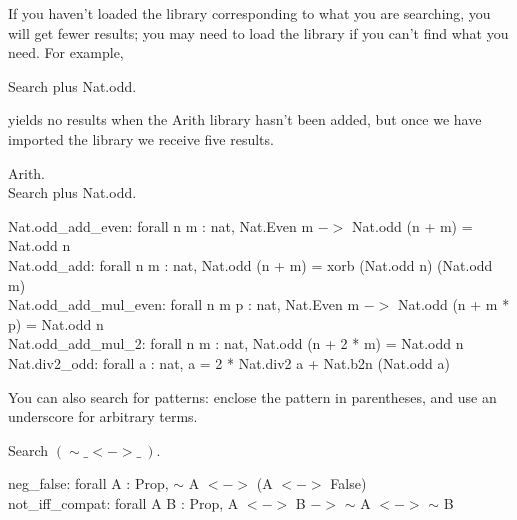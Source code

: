 \noindent 
If you haven't loaded the library corresponding to what you are searching, you will get fewer results; you may need to load the library if you can't find what you need. For example,
\begin{code}
	Search plus Nat.odd.
\end{code}
yields no results when the Arith library hasn't been added, but once we have imported the library we receive five results.
\begin{code}
	 Arith. 	\\
	Search plus Nat.odd.
\end{code}
\begin{msg}
	Nat.odd\_add\_even: forall n m : nat, Nat.Even m $->$ Nat.odd (n + m) = Nat.odd n	\\
	Nat.odd\_add: forall n m : nat, Nat.odd (n + m) = xorb (Nat.odd n) (Nat.odd m)		\\
	Nat.odd\_add\_mul\_even: forall n m p : nat, Nat.Even m $->$ Nat.odd (n + m * p) = Nat.odd n	\\
	Nat.odd\_add\_mul\_2: forall n m : nat, Nat.odd (n + 2 * m) = Nat.odd n	\\
	Nat.div2\_odd: forall a : nat, a = 2 * Nat.div2 a + Nat.b2n (Nat.odd a)
\end{msg}

\noindent
You can also search for patterns: enclose the pattern in parentheses, and use an underscore for arbitrary terms.
\begin{code}
	Search $(\sim \_ <-> \_\ )$.
\end{code}
\begin{msg}
	neg\_false: forall A : Prop, $\sim$ A $<->$ (A $<->$ False)		\\
	not\_iff\_compat: forall A B : Prop, A $<->$ B $->$ $\sim$ A $<->$ $\sim$ B
\end{msg}




